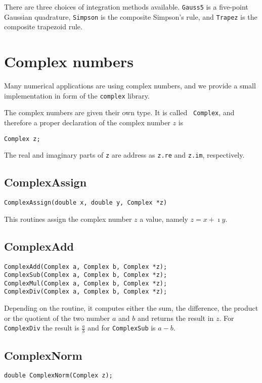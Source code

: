 \documentclass[12pt]{article}
\begin{document}
There are three choices of integration methods available. {\tt Gauss5}
is a five-point Gaussian quadrature, {\tt Simpson} is the composite
Simpson's rule, and {\tt Trapez} is the composite trapezoid rule.


\section{Complex numbers}
\label{sec:complex}

Many numerical applications are using complex numbers, and we provide
a small implementation in form of the {\tt complex} library. 

The complex numbers are given their own type. It is called {\tt
  Complex}, and therefore a proper declaration of the complex number
$z$ is

\begin{verbatim}
Complex z;
\end{verbatim}

The real and imaginary parts of {\tt z} are address as {\tt z.re} and
{\tt z.im}, respectively.


\subsection{ComplexAssign}
\label{sec:ComplexAssign}
\begin{verbatim}
ComplexAssign(double x, double y, Complex *z)
\end{verbatim}

This routines assign the complex number $z$ a value, namely $z =
x+\imath y$.


\subsection{ComplexAdd}
\label{sec:ComplexOper}
\begin{verbatim}
ComplexAdd(Complex a, Complex b, Complex *z);
ComplexSub(Complex a, Complex b, Complex *z);
ComplexMul(Complex a, Complex b, Complex *z);
ComplexDiv(Complex a, Complex b, Complex *z);
\end{verbatim}

Depending on the routine, it computes either the sum, the difference,
the product or the quotient of the two number $a$ and $b$ and returns
the result in $z$. For {\tt ComplexDiv} the result is $\frac{a}{b}$
and for {\tt ComplexSub} is $a-b$.


\subsection{ComplexNorm}
\label{sec:ComplexNorm}
\begin{verbatim}
double ComplexNorm(Complex z);
\end{verbatim}
\end{document}
